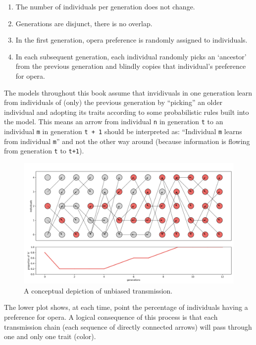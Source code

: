 \documentclass[
  a4paperpaper,
  ,captions=tableheading
]{scrbook}
\providecommand{\tightlist}{%
  \setlength{\itemsep}{0pt}\setlength{\parskip}{0pt}}
\begin{document}
\begin{enumerate}
\def\labelenumi{\arabic{enumi}.}
\tightlist
\item
  The number of individuals per generation does not change.
\item
  Generations are disjunct, there is no overlap.
\item
  In the first generation, opera preference is randomly assigned to
  individuals.
\item
  In each subsequent generation, each individual randomly picks an
  `ancestor' from the previous generation and blindly copies that
  individual's preference for opera.
\end{enumerate}

The models throughout this book assume that invidivuals in one
generation learn from individuals of (only) the previous generation by
``picking'' an older individual and adopting its traits according to
some probabilistic rules built into the model. This means an arrow from
individual \texttt{n} in generation \texttt{t} to an individual
\texttt{m} in generation \texttt{t\ +\ 1} should be interpreted as:
``Individual \texttt{m} learns from individual \texttt{m}'' and not the
other way around (because information is flowing from generation
\texttt{t} to \texttt{t+1}).

\begin{figure}

{\centering \includegraphics{img/chains.png}

}

\caption{A conceptual depiction of unbiased transmission.}

\end{figure}

The lower plot shows, at each time, point the percentage of individuals
having a preference for opera. A logical consequence of this process is
that each transmission chain (each sequence of directly connected
arrows) will pass through one and only one trait (color).
\end{document}
